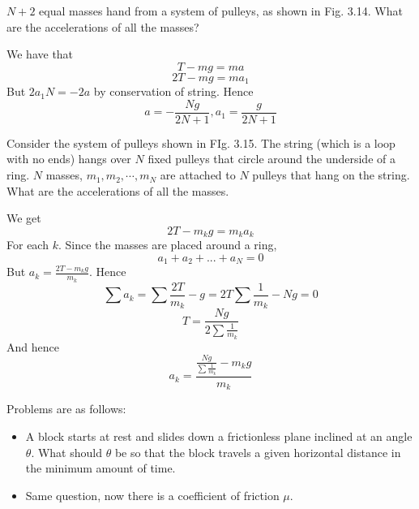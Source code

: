 \documentclass[11pt]{scrartcl}
\begin{document}
\begin{example}
  [3.4]
  $N+2$ equal masses hand from a system of pulleys, as shown in Fig. 3.14.
  What are the accelerations of all the masses?
\end{example}
\begin{soln}
  We have that
  $$T-mg=ma$$
  $$2T-mg=ma_1$$
  But $2a_1N=-2a$ by conservation of string. Hence
  $$a=-\frac{Ng}{2N+1}, a_1=\frac{g}{2N+1}$$
\end{soln}
\begin{example}
  [3.5]
  Consider the system of pulleys shown in FIg. 3.15. The string (which is a loop with no ends)
  hangs over $N$ fixed pulleys that circle around the underside of a ring.
  $N$ masses, $m_1, m_2,\cdots, m_N$ are attached to $N$ pulleys that hang
  on the string. What are the accelerations of all the masses.
\end{example}
\begin{soln}
  We get
  $$2T-m_k g=m_ka_k$$
  For each $k$. Since the masses are placed around a ring,
  $$a_1+a_2+...+a_N=0$$
  But $a_k=\frac{2T-m_k g}{m_k}$. Hence
  $$\sum a_k=\sum \frac{2T}{m_k}-g=2T\sum \frac{1}{m_k}-Ng=0$$
  $$T=\frac{Ng}{2\sum \frac{1}{m_k}}$$
  And hence
  $$a_k=\frac{\frac{Ng}{\sum \frac{1}{m_k}}-m_k g}{m_k}$$
\end{soln}
\begin{example}
  [3.6]
  Problems are as follows:
  \begin{itemize}
    \item A block starts at rest and slides down a frictionless plane
      inclined at an angle $\theta$. What should $\theta$ be so that the block
      travels a given horizontal distance in the minimum amount of time.
    \item Same question, now there is a coefficient of friction $\mu$.
  \end{itemize}
\end{example}
\end{document}

